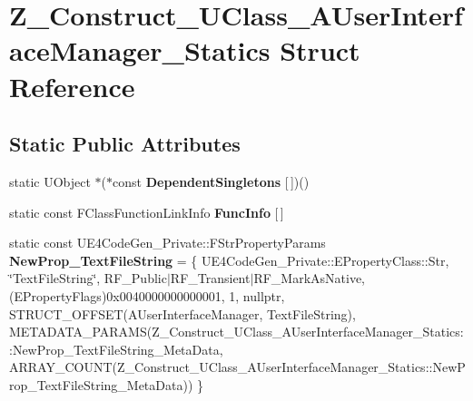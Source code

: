 \hypertarget{struct_z___construct___u_class___a_user_interface_manager___statics}{}\section{Z\+\_\+\+Construct\+\_\+\+U\+Class\+\_\+\+A\+User\+Interface\+Manager\+\_\+\+Statics Struct Reference}
\label{struct_z___construct___u_class___a_user_interface_manager___statics}
\subsection*{Static Public Attributes}
\begin{DoxyCompactItemize}
\item 
\mbox{\label{struct_z___construct___u_class___a_user_interface_manager___statics_adbb5d482ee377a5756ad117e28960925}} 
static U\+Object $\ast$($\ast$const {\bfseries Dependent\+Singletons} \mbox{[}$\,$\mbox{]})()
\item 
static const F\+Class\+Function\+Link\+Info {\bfseries Func\+Info} \mbox{[}$\,$\mbox{]}
\item 
\mbox{\label{struct_z___construct___u_class___a_user_interface_manager___statics_af76fec7f2e44c026c75ede4c411e0fa8}} 
static const U\+E4\+Code\+Gen\+\_\+\+Private\+::\+F\+Str\+Property\+Params {\bfseries New\+Prop\+\_\+\+Text\+File\+String} = \{ U\+E4\+Code\+Gen\+\_\+\+Private\+::\+E\+Property\+Class\+::\+Str, \char`\"{}Text\+File\+String\char`\"{}, R\+F\+\_\+\+Public$\vert$R\+F\+\_\+\+Transient$\vert$R\+F\+\_\+\+Mark\+As\+Native, (E\+Property\+Flags)0x0040000000000001, 1, nullptr, S\+T\+R\+U\+C\+T\+\_\+\+O\+F\+F\+S\+E\+T(\+A\+User\+Interface\+Manager, Text\+File\+String), M\+E\+T\+A\+D\+A\+T\+A\+\_\+\+P\+A\+R\+A\+M\+S(\+Z\+\_\+\+Construct\+\_\+\+U\+Class\+\_\+\+A\+User\+Interface\+Manager\+\_\+\+Statics\+::\+New\+Prop\+\_\+\+Text\+File\+String\+\_\+\+Meta\+Data, A\+R\+R\+A\+Y\+\_\+\+C\+O\+U\+N\+T(\+Z\+\_\+\+Construct\+\_\+\+U\+Class\+\_\+\+A\+User\+Interface\+Manager\+\_\+\+Statics\+::\+New\+Prop\+\_\+\+Text\+File\+String\+\_\+\+Meta\+Data)) \}
\item 
\mbox{\label{struct_z___construct___u_class___a_user_interface_manager___statics_a03fa639d5dd56bc7465353f88351ac30}} 

\end{DoxyCompactItemize}
